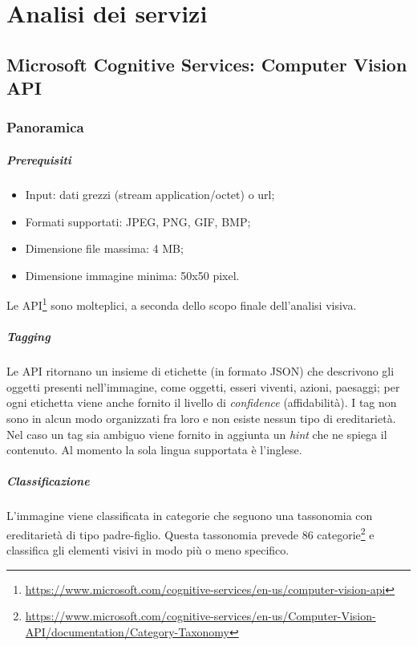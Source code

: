 \documentclass[fleqn,a4paper,11pt]{report}
\begin{document}
{\let\clearpage\relax \chapter{Analisi dei servizi}}
\section{Microsoft Cognitive Services: Computer Vision API}
\subsection{Panoramica}
\paragraph{Prerequisiti}
\begin{itemize}
\item Input: dati grezzi (stream application/octet) o url;
\item Formati supportati: JPEG, PNG, GIF, BMP;
\item Dimensione file massima: 4 MB;
\item Dimensione immagine minima: 50x50 pixel. 
\end{itemize}
%

Le API\footnote{\url{https://www.microsoft.com/cognitive-services/en-us/computer-vision-api}} sono molteplici, a seconda dello scopo finale dell'analisi visiva.

\paragraph{Tagging} Le API ritornano un insieme di etichette (in formato JSON) che descrivono gli oggetti presenti nell'immagine, come oggetti, esseri viventi, azioni, paesaggi; per ogni etichetta viene anche fornito il livello di \textit{confidence} (affidabilità). I tag non sono in alcun modo organizzati fra loro e non esiste nessun tipo di ereditarietà.
Nel caso un tag sia ambiguo viene fornito in aggiunta un \textit{hint} che ne spiega il contenuto.
Al momento la sola lingua supportata è l'inglese.

\paragraph{Classificazione} L'immagine viene classificata in categorie che seguono una tassonomia con ereditarietà di tipo padre-figlio. Questa tassonomia prevede 86 categorie\footnote{\url{https://www.microsoft.com/cognitive-services/en-us/Computer-Vision-API/documentation/Category-Taxonomy}} e classifica gli elementi visivi in modo più o meno specifico.
\end{document}
